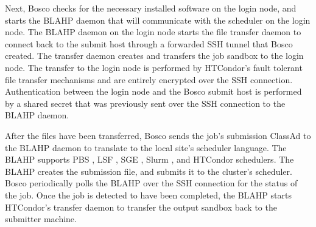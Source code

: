 

Next, Bosco checks for the necessary installed software on the login node, and starts the BLAHP \cite{blahp} daemon that will communicate with the scheduler on the login node.  The BLAHP daemon on the login node starts the file transfer daemon to connect back to the submit host through a forwarded SSH tunnel that Bosco created.  The transfer daemon creates and transfers the job sandbox to the login node.  The transfer to the login node is performed by HTCondor's fault tolerant file transfer mechanisms and are entirely encrypted over the SSH connection.  Authentication between the login node and the Bosco submit host is performed by a shared secret that was previously sent over the SSH connection to the BLAHP daemon.

After the files have been transferred, Bosco sends the job's submission ClassAd \cite{raman1998matchmaking} to the BLAHP daemon to translate to the local site's scheduler language.  The BLAHP supports PBS \cite{computing2013torque}, LSF \cite{computinglsf}, SGE \cite{gentzsch2001sun}, Slurm \cite{yoo2003slurm}, and HTCondor schedulers.  The BLAHP creates the submission file, and submits it to the cluster's scheduler.  Bosco periodically polls the BLAHP over the SSH connection for the status of the job.  Once the job is detected to have been completed, the BLAHP starts HTCondor's transfer daemon to transfer the output sandbox back to the submitter machine.

